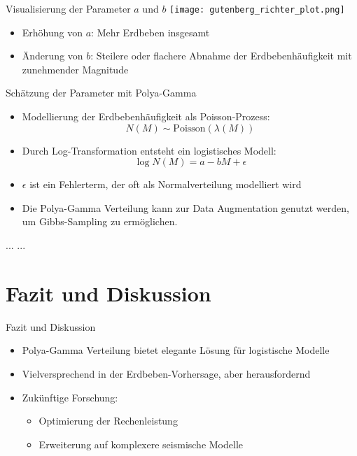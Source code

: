 \documentclass{beamer}
\begin{document}
\begin{frame}{Visualisierung der Parameter $a$ und $b$}
	\centering
	\texttt{[image: gutenberg\_richter\_plot.png]} %
	\begin{itemize}
		\item Erhöhung von $a$: Mehr Erdbeben insgesamt
		\item Änderung von $b$: Steilere oder flachere Abnahme der Erdbebenhäufigkeit mit zunehmender Magnitude
	\end{itemize}
\end{frame}


\begin{frame}{Schätzung der Parameter mit Polya-Gamma}
	\begin{itemize}
		\item Modellierung der Erdbebenhäufigkeit als Poisson-Prozess:
		\[ N(M) \sim \text{Poisson}(\lambda(M)) \]
		\item Durch Log-Transformation entsteht ein logistisches Modell:
		\[ \log N(M) = a - bM + \epsilon \]
		\item $\epsilon$ ist ein Fehlerterm, der oft als Normalverteilung modelliert wird
		\item Die Polya-Gamma Verteilung kann zur Data Augmentation genutzt werden, um Gibbs-Sampling zu ermöglichen.
	\end{itemize}
\end{frame}

\begin{frame}{...}
	...
\end{frame}

\section{Fazit und Diskussion}
\begin{frame}{Fazit und Diskussion}
	\begin{itemize}
		\item Polya-Gamma Verteilung bietet elegante Lösung für logistische Modelle
		\item Vielversprechend in der Erdbeben-Vorhersage, aber herausfordernd
		\item Zukünftige Forschung:
		\begin{itemize}
			\item Optimierung der Rechenleistung
			\item Erweiterung auf komplexere seismische Modelle
		\end{itemize}
	\end{itemize}
\end{frame}
\end{document}
